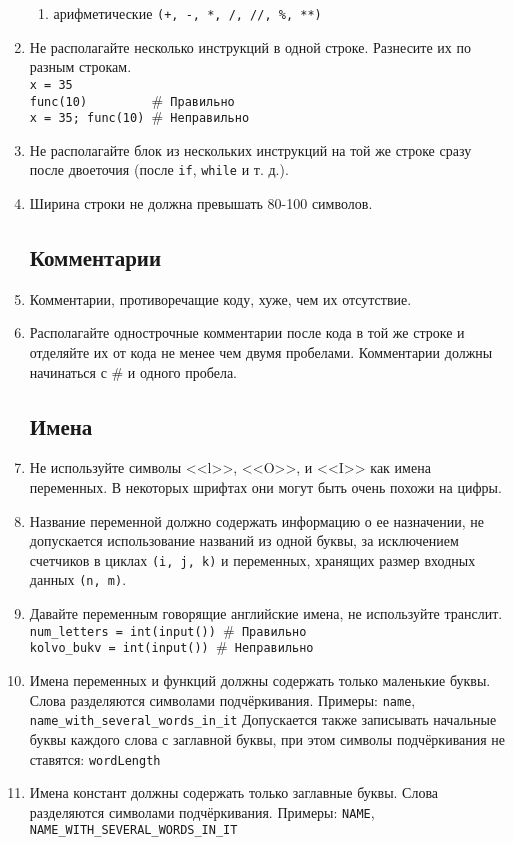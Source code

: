 \documentclass[11pt,a4paper,oneside]{article}
\begin{document}
\begin{enumerate}
\begin{enumerate}
            \item арифметические \texttt{(+, -, *, /, //, \%, **)}
          \end{enumerate}              
    \item Не располагайте несколько инструкций в одной строке. Разнесите их по разным строкам.
          \\ \texttt{x = 35} 
          \\ \texttt{func(10) \hbox{ } \hbox{ } \hbox{ } \hbox{ } $\#$ Правильно}
          \\ \texttt{x = 35; func(10) $\#$ Неправильно}
    \item Не располагайте блок из нескольких инструкций на той же строке сразу после 
          двоеточия (после \texttt{if}, \texttt{while} и т. д.).
    \item Ширина строки не должна превышать 80-100 символов.

\subsection*{Комментарии}
    
     \item Комментарии, противоречащие коду, хуже, чем их отсутствие.
     \item Располагайте однострочные комментарии после кода в той же строке и отделяйте
           их от кода не менее чем двумя пробелами. Комментарии должны начинаться с $\#$ и
           одного пробела.

\subsection*{Имена}

     \item Не используйте символы <<l>>, <<O>>, и <<I>> как имена переменных. 
           В некоторых шрифтах они могут быть очень похожи на цифры.
     \item Название переменной должно содержать информацию о ее назначении, 
            не допускается использование названий из одной буквы, за исключением счетчиков в циклах
            \texttt{(i, j, k)} и переменных, хранящих размер входных данных \texttt{(n, m)}.
     \item Давайте переменным говорящие английские имена, не используйте транслит.
           \\ \texttt{num\_letters = int(input()) $\#$ Правильно}
           \\ \texttt{kolvo\_bukv = int(input()) \quad $\#$ Неправильно}
     \item Имена переменных и функций должны содержать только маленькие буквы. Слова
           разделяются символами подчёркивания. Примеры:
           \texttt{name}, \texttt{name\_with\_several\_words\_in\_it}
           Допускается также записывать начальные буквы каждого слова с заглавной буквы,
           при этом символы подчёркивания не ставятся: \texttt{wordLength}  
     \item Имена констант должны содержать только заглавные буквы. Слова разделяются
           символами подчёркивания. Примеры: \texttt{NAME}, \texttt{NAME\_WITH\_SEVERAL\_WORDS\_IN\_IT}


\end{enumerate}
\end{document}
